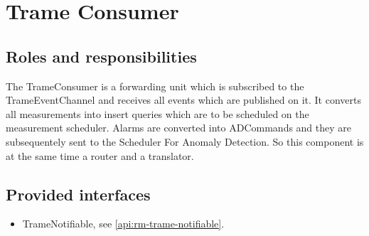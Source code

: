 \section{Trame Consumer}
\label{element:rm-trame-consumer}

\subsection{Roles and responsibilities}

\npar The TrameConsumer is a forwarding unit which is subscribed to the
TrameEventChannel and receives all events which are published on it. It
converts all measurements into insert queries which are to be scheduled on the
measurement scheduler. Alarms are converted into ADCommands and they are
subsequentely sent to the Scheduler For Anomaly Detection. So this component is
at the same time a router and a translator.

\subsection{Provided interfaces}

\begin{itemize}
  \item TrameNotifiable, see \ref{api:rm-trame-notifiable}.
\end{itemize}

